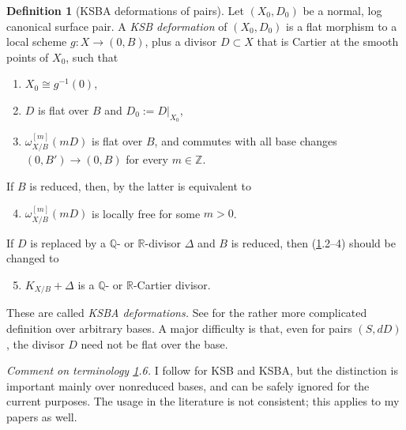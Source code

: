 \documentclass{amsart}
\theoremstyle{definition}
\newtheorem{defn}[thm]{Definition}
\theoremstyle{remark}
\newcommand{\z}[0]{{\mathbb Z}}
\renewcommand{\r}[0]{{\mathbb R}}
\newcommand{\q}[0]{{\mathbb Q}}
\begin{document}
\begin{defn}[KSBA deformations of pairs]\label{ksb.defs.pair.defn}
  Let $(X_0, D_0)$ be a normal, log canonical surface pair. A {\it KSB deformation} of $(X_0, D_0)$ 
  is a flat morphism to a local scheme $g: X\to (0,B)$, plus a divisor $D\subset X$  that is Cartier at the smooth points of $X_0$,   such that
  \begin{enumerate}
  \item $X_0\cong g^{-1}(0)$,
    \item $D$ is flat over $B$  and $D_0:=D|_{X_0}$,
  \item $\omega_{X/B}^{[m]}(mD)$ is flat over $B$, and  commutes with all base changes $(0,B')\to (0, B)$ for every $m\in\z$.
  \end{enumerate}
  If $B$ is reduced, then, by \cite[2.3 and 4.7]{k-modbook} the latter  is equivalent to 
\begin{enumerate}\setcounter{enumi}{3}
  \item $\omega_{X/B}^{[m]}(mD)$ is locally free for some  $m>0$.
\end{enumerate}
If  $D$ is replaced by a $\q$- or  $\r$-divisor $\Delta$ and $B$ is reduced, then (\ref{ksb.defs.pair.defn}.2--4) should be changed to
\begin{enumerate}\setcounter{enumi}{4}
  \item $K_{X/B}+\Delta$ is a $\q$- or  $\r$-Cartier divisor.
\end{enumerate}
These are called {\it KSBA deformations.}
See \cite[Sec.8.2]{k-modbook} for the rather more complicated definition over arbitrary bases.
A major difficulty is that, even for pairs $(S, dD)$, the divisor $D$ need not be flat over the base.

\medskip
{\it Comment on terminology \ref{ksb.defs.pair.defn}.6.}
 I follow  \cite{k-modbook} for KSB and KSBA, but the distinction is important mainly over nonreduced bases, and can be safely ignored for the current purposes.
The usage in the literature  is not consistent; this applies to  my papers as well.
\end{defn}
\end{document}
